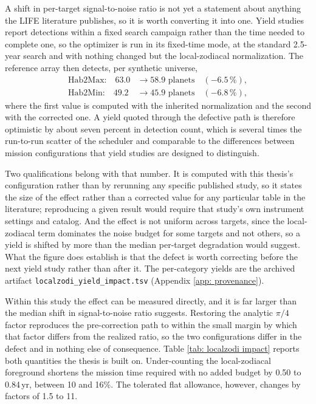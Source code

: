 \documentclass[12pt,a4paper]{article}
\numberwithin{equation}{section}
\numberwithin{figure}{section}
\numberwithin{table}{section}
\begin{document}
A shift in per-target signal-to-noise ratio is not yet a statement about anything the LIFE literature publishes, so it is worth converting it into one. Yield studies report detections within a fixed search campaign rather than the time needed to complete one, so the optimizer is run in its fixed-time mode, at the standard 2.5-year search and with nothing changed but the local-zodiacal normalization. The reference array then detects, per synthetic universe,
\begin{align*}
\text{Hab2Max:}\quad 63.0 &\rightarrow 58.9 \text{ planets} \quad (-6.5\,\%),\\
\text{Hab2Min:}\quad 49.2 &\rightarrow 45.9 \text{ planets} \quad (-6.8\,\%),
\end{align*}
where the first value is computed with the inherited normalization and the second with the corrected one. A yield quoted through the defective path is therefore optimistic by about seven percent in detection count, which is several times the run-to-run scatter of the scheduler and comparable to the differences between mission configurations that yield studies are designed to distinguish.

Two qualifications belong with that number. It is computed with this thesis's configuration rather than by rerunning any specific published study, so it states the size of the effect rather than a corrected value for any particular table in the literature; reproducing a given result would require that study's own instrument settings and catalog. And the effect is not uniform across targets, since the local-zodiacal term dominates the noise budget for some targets and not others, so a yield is shifted by more than the median per-target degradation would suggest. What the figure does establish is that the defect is worth correcting before the next yield study rather than after it. The per-category yields are the archived artifact \texttt{localzodi\_yield\_impact.tsv} (Appendix \ref{app: provenance}).

Within this study the effect can be measured directly, and it is far larger than the median shift in signal-to-noise ratio suggests. Restoring the analytic $\pi/4$ factor reproduces the pre-correction path to within the small margin by which that factor differs from the realized ratio, so the two configurations differ in the defect and in nothing else of consequence. Table \ref{tab: localzodi impact} reports both quantities the thesis is built on. Under-counting the local-zodiacal foreground shortens the mission time required with no added budget by 0.50 to 0.84\,yr, between 10 and 16\%. The tolerated flat allowance, however, changes by factors of 1.5 to 11.
\end{document}
